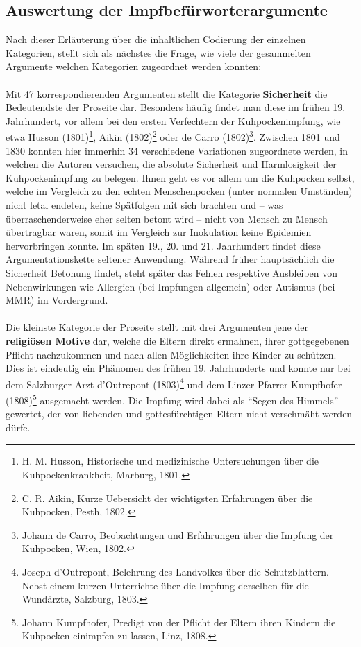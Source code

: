 \documentclass[
    a4paper,
    12pt,
    hyphens,
    chapterprefix=true,
    headheight=33pt,
    footheight=29pt,
    headings=optiontohead, %
]{scrartcl}
\begin{document}
{\subsection{Auswertung der Impfbefürworterargumente}
Nach dieser Erläuterung über die inhaltlichen Codierung der einzelnen Kategorien, stellt sich als nächstes die Frage, wie viele der gesammelten Argumente welchen Kategorien zugeordnet werden konnten:\\
\\
Mit 47 korrespondierenden Argumenten stellt die Kategorie \textbf{Sicherheit} die Bedeutendste der Proseite dar. Besonders häufig findet man diese im frühen 19. Jahrhundert, vor allem bei den ersten Verfechtern der Kuhpockenimpfung, wie etwa Husson (1801)\footnote{H. M. Husson, Historische und medizinische Untersuchungen über die Kuhpockenkrankheit, Marburg, 1801.}, Aikin (1802)\footnote{C. R. Aikin, Kurze Uebersicht der wichtigsten Erfahrungen über die Kuhpocken, Pesth, 1802.} oder de Carro (1802)\footnote{Johann de Carro, Beobachtungen und Erfahrungen über die Impfung der Kuhpocken, Wien, 1802.}. Zwischen 1801 und 1830 konnten hier immerhin 34 verschiedene Variationen zugeordnete werden, in welchen die Autoren versuchen, die absolute Sicherheit und Harmlosigkeit der Kuhpockenimpfung zu belegen. Ihnen geht es vor allem um die Kuhpocken selbst, welche im Vergleich zu den echten Menschenpocken (unter normalen Umständen) nicht letal endeten, keine Spätfolgen mit sich brachten und -- was überraschenderweise eher selten betont wird -- nicht von Mensch zu Mensch übertragbar waren, somit im Vergleich zur Inokulation keine Epidemien hervorbringen konnte. Im späten 19., 20. und 21. Jahrhundert findet diese Argumentationskette seltener Anwendung. Während früher hauptsächlich die Sicherheit Betonung findet, steht später das Fehlen respektive Ausbleiben von Nebenwirkungen wie Allergien (bei Impfungen allgemein) oder Autismus (bei MMR) im Vordergrund.\\
\\
Die kleinste Kategorie der Proseite stellt mit drei Argumenten jene der \textbf{religiösen Motive} dar, welche die Eltern direkt ermahnen, ihrer gottgegebenen Pflicht nachzukommen und nach allen Möglichkeiten ihre Kinder zu schützen. Dies ist eindeutig ein Phänomen des frühen 19. Jahrhunderts und konnte nur bei dem Salzburger Arzt d'Outrepont (1803)\footnote{Joseph d'Outrepont, Belehrung des Landvolkes über die Schutzblattern. Nebst einem kurzen Unterrichte über die Impfung derselben für die Wundärzte, Salzburg, 1803.} und dem Linzer Pfarrer Kumpfhofer (1808)\footnote{Johann Kumpfhofer, Predigt von der Pflicht der Eltern ihren Kindern die Kuhpocken einimpfen zu lassen, Linz, 1808.} ausgemacht werden. Die Impfung wird dabei als "`Segen des Himmels"' gewertet, der von liebenden und gottesfürchtigen Eltern nicht verschmäht werden dürfe.\\
}
\end{document}
